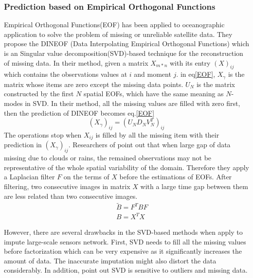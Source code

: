 \subsubsection{Prediction based on Empirical Orthogonal Functions }
Empirical Orthogonal Functions(EOF) has been applied to oceanographic application to solve the problem of missing or unreliable satellite data\cite{beckers2003eof}. 
They propose the DINEOF (Data Interpolating Empirical Orthogonal Functions) which is an Singular value decomposition(SVD)-based technique for the reconstruction of missing data.
In their method, given a matrix $X_{m*n}$ with its entry $(X)_{ij}$ which contains the observations values at $i$ and moment $j$. 
in eq\ref{EOF}, $X_\gamma$ is the matrix whose items are zero except the missing data points.
$U_N$ is the matrix constructed by the first $N$ spatial EOFs, which have the same meaning as $N$-modes in SVD. 
In their method, all the missing values are filled with zero first, then the prediction of DINEOF becomes eq.\ref{EOF}
\begin{equation}
(X_\gamma)_{ij} = (U_ND_NV_N^T)_{ij}
\label{EOF}
\end{equation}
The operations stop when $X_{ij}$ is filled by all the missing item with their prediction in $(X_\gamma)_{ij}$. 
Researchers of \cite{alvera2009enhancing} point out that when large gap of data missing due to clouds or rains, the remained observations may not be representative of the whole spatial variability of the domain. Therefore they apply a Laplacian filter $F$ on the terms of $X$ before the estimations of EOFs. After filtering, two consecutive images in matrix $X$ with a large time gap between them are less related than two consecutive images. 
\begin{eqnarray}
&&\tilde{B} = F^TBF \\
&&B=X^TX
\label{enhance_eof}
\end{eqnarray} 

However, there are several drawbacks in the SVD-based methods when apply to impute large-scale sensors network. First, SVD needs to fill all the missing values before factorization which can be very expensive as it significantly increases the amount of data. The inaccurate imputation might also distort the data considerably\cite{koren2009matrix}. In addition,\cite{ke2005robust} point out SVD is sensitive to outliers and missing data. 
  
